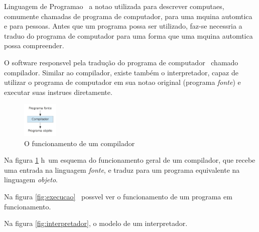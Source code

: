 
Linguagem de Programa\ca o \eh\ a nota\ca o utilizada para descrever computa\co es, comumente chamadas de programa de computador, para uma m\ah quina autom\ah tica e para pessoas. Antes que um programa possa ser utilizado, faz-se necess\ah ria a tradu\ca o do programa de computador para uma forma que uma m\ah quina autom\ah tica possa compreender.

O software respons\ah vel pela tradução do programa de computador \eh\ chamado compilador. Similar ao compilador, existe também o interpretador, capaz de utilizar o programa de computador em sua nota\ca o original (programa \emph{fonte}) e executar suas instru\co es diretamente.


\begin{figure}[!htbp]
  \includegraphics[width=0.15\textwidth]{figuras/compilador}
  \caption{O funcionamento de um compilador}
  \label{fig:compilador}
\end{figure}

Na figura \ref{fig:compilador} h\ah\ um esquema do funcionamento geral de um compilador, que recebe uma entrada na linguagem \emph{fonte}, e traduz para um programa equivalente na linguagem \emph{objeto}.


Na figura \ref{fig:execucao} \eh\ poss\ih vel ver o funcionamento de um programa em funcionamento.


Na figura \ref{fig:interpretador}, o modelo de um interpretador.

